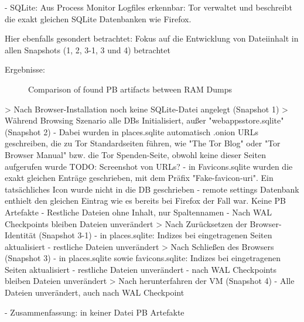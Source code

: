 - SQLite: 
	Aus Process Monitor Logfiles erkennbar: Tor verwaltet und beschreibt die exakt gleichen SQLite Datenbanken wie Firefox.

	Hier ebenfalls gesondert betrachtet: Fokus auf die Entwicklung von Dateiinhalt in allen Snapshots (1, 2, 3-1, 3 und 4) betrachtet
	
	Ergebnisse:
		\begin{figure}[h!]
			\centerline{}
			\label{chart:final-criteria}  
			\caption{Comparison of found PB artifacts between RAM Dumps}
		\end{figure}
		> Nach Browser-Installation noch keine SQLite-Datei angelegt (Snapshot 1)
		> Während Browsing Szenario alle DBs Initialisiert, außer "webappsstore.sqlite" (Snapshot 2)
			- Dabei wurden in places.sqlite automatisch .onion URLs geschreiben, die zu Tor Standardseiten führen, wie "The Tor Blog" oder "Tor Browser Manual" bzw. die Tor Spenden-Seite, obwohl keine dieser Seiten aufgerufen wurde
				TODO: Screenshot von URLs?
			- in Favicons.sqlite wurden die exakt gleichen Enträge geschrieben, mit dem Präfix "Fake-favicon-uri". Ein tatsächliches Icon wurde nicht in die DB geschrieben
			- remote settings Datenbank enthielt den gleichen Eintrag wie es bereits bei Firefox der Fall war. Keine PB Artefakte
			- Restliche Dateien ohne Inhalt, nur Spaltennamen
			- Nach WAL Checkpoints bleiben Dateien unverändert
		> Nach Zurücksetzen der Browser-Identität (Snapshot 3-1)
			- in places.sqlite: Indizes bei eingetragenen Seiten aktualisiert
			- restliche Dateien unverändert
		> Nach Schließen des Browsers (Snapshot 3)
			- in places.sqlite sowie favicons.sqlite: Indizes bei eingetragenen Seiten aktualisiert
			- restliche Dateien unverändert
			- nach WAL Checkpoints bleiben Dateien unverändert
		> Nach herunterfahren der VM (Snapshot 4)
			- Alle Dateien unverändert, auch nach WAL Checkpoint
	
- Zusammenfassung: in keiner Datei PB Artefakte


